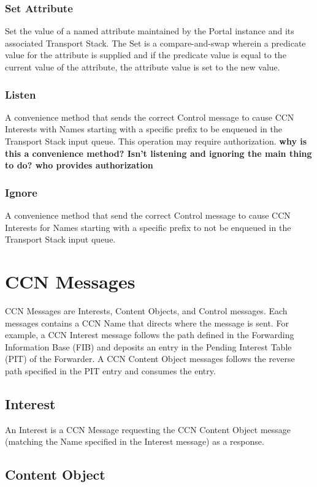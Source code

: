 \subsubsection{Set Attribute}
Set the value of a named attribute maintained by the Portal instance and its associated Transport Stack.
The Set is a compare-and-swap wherein a predicate value for the attribute is supplied and if the predicate value 
is equal to the current value of the attribute,
the attribute value is set to the new value.  

\subsubsection{Listen}
A convenience method that sends the correct Control message to cause CCN Interests with Names starting with a specific prefix to be enqueued in the Transport Stack input queue.
This operation may require authorization. {\bf why is this a convenience method?  Isn't listening and ignoring the main thing to do? who provides authorization}

\subsubsection{Ignore}
A convenience method that send the correct Control message to cause CCN Interests for Names starting with a specific prefix to not be enqueued in the Transport Stack input queue.

\section{CCN Messages}
CCN Messages are Interests, Content Objects, and Control messages.
Each messages contains a CCN Name that directs where the message is sent.
For example, a CCN Interest message follows the path defined in the Forwarding Information Base (FIB) and deposits an entry in the Pending Interest Table (PIT) of the Forwarder.
A CCN Content Object messages follows the reverse path specified in the PIT entry and consumes the entry.

\subsection{Interest}
An Interest is a CCN Message requesting the CCN Content Object message (matching the Name specified in the Interest message) as a response.

\subsection{Content Object}

